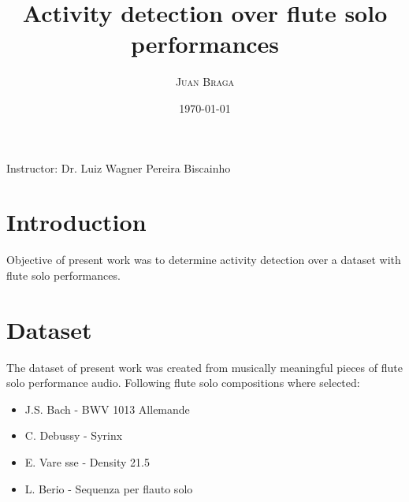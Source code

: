 \documentclass{article}
\title{Activity detection over flute solo performances} %
\author{\textsc{Juan Braga}} %
\date{\today} %
\begin{document}
\maketitle %
\begin{center}
Instructor: Dr. Luiz Wagner Pereira Biscainho %
\end{center}



\section{Introduction}

Objective of present work was to determine activity detection over a dataset with flute solo performances. 


 

\section{Dataset}
The dataset of present work was created from musically meaningful pieces of flute solo performance audio. Following flute solo compositions where selected:   
\begin{itemize}  
\item J.S. Bach - BWV 1013 Allemande 
\item C. Debussy - Syrinx
\item E. Vare	sse - Density 21.5 
\item L. Berio - Sequenza per flauto solo 
\end{itemize}
\end{document}
